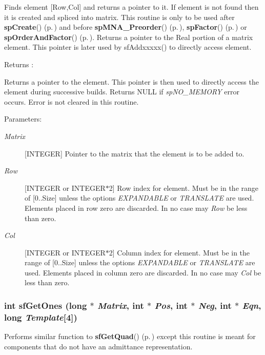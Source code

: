 Finds element [Row,Col] and returns a pointer to it. If element is not found then it is created and spliced into matrix. This routine is only to be used after {\bf sp\-Create}() {\rm (p.\,\pageref{spAllocate_8c_a11})} and before {\bf sp\-MNA\_\-Preorder}() {\rm (p.\,\pageref{spUtils_8c_a11})}, {\bf sp\-Factor}() {\rm (p.\,\pageref{spFactor_8c_a25})} or {\bf sp\-Order\-And\-Factor}() {\rm (p.\,\pageref{spFactor_8c_a24})}. Returns a pointer to the Real portion of a matrix element. This pointer is later used by sf\-Addxxxxx() to directly access element.

\begin{Desc}
\item[Returns :]\par
[INTEGER] Returns a pointer to the element. This pointer is then used to directly access the element during successive builds. Returns NULL if {\em sp\-NO\_\-MEMORY} error occurs. Error is not cleared in this routine.\end{Desc}
\begin{Desc}
\item[Parameters: ]\par
\begin{description}
\item[{\em 
Matrix}][INTEGER] Pointer to the matrix that the element is to be added to. \item[{\em 
Row}][INTEGER or INTEGER$\ast$2] Row index for element. Must be in the range of [0..Size] unless the options {\em EXPANDABLE} or {\em TRANSLATE} are used. Elements placed in row zero are discarded. In no case may {\em Row} be less than zero. \item[{\em 
Col}][INTEGER or INTEGER$\ast$2] Column index for element. Must be in the range of [0..Size] unless the options {\em EXPANDABLE} or {\em TRANSLATE} are used. Elements placed in column zero are discarded. In no case may {\em Col} be less than zero. \end{description}
\end{Desc}
\subsubsection{\setlength{\rightskip}{0pt plus 5cm}int sf\-Get\-Ones (long $\ast$ {\em Matrix}, int $\ast$ {\em Pos}, int $\ast$ {\em Neg}, int $\ast$ {\em Eqn}, long {\em Template}[4])}\label{spFortran_8c_a54}


Performs similar function to {\bf sf\-Get\-Quad}() {\rm (p.\,\pageref{spFortran_8c_a53})} except this routine is meant for components that do not have an admittance representation.


